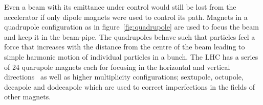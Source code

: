 Even a beam with its emittance under control would still be lost from the
accelerator if only dipole magnets were used to control its path. Magnets in a
quadrupole configuration as in figure~\ref{fig:quadrupole} are used to focus the
beam and keep it in the beam-pipe. The quadrupoles behave such that particles
feel a force that increases with the distance from the centre of the beam
leading to simple harmonic motion of individual particles in a bunch. The LHC
has a series of 24 quarupole magnets each for focusing in the horizontal and vertical
directions~\cite{LHC-dr} as well as higher multiplicity configurations;
sextupole, octupole, decapole and dodecapole which are used to correct
imperfections in the fields of other magnets.


